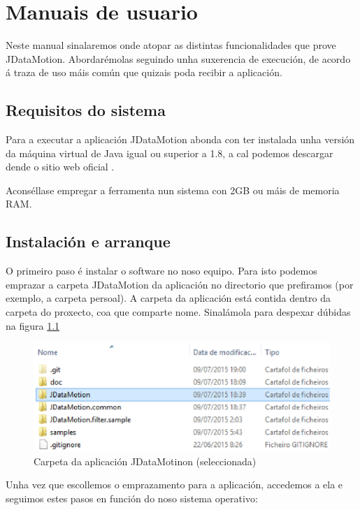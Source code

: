 \chapter{Manuais de usuario}

Neste manual sinalaremos onde atopar as distintas funcionalidades que prove JDataMotion. Abordarémolas seguindo unha suxerencia de execución, de acordo á traza de uso máis común que quizais poda recibir a aplicación.

\section{Requisitos do sistema}

Para a executar a aplicación JDataMotion abonda con ter instalada unha versión da máquina virtual de Java igual ou superior a 1.8, a cal podemos descargar dende o sitio web oficial \cite{java}.

Aconséllase empregar a ferramenta nun sistema con 2GB ou máis de memoria RAM.

\section{Instalación e arranque}

O primeiro paso é instalar o software no noso equipo. Para isto podemos emprazar a carpeta JDataMotion da aplicación no directorio que prefiramos (por exemplo, a carpeta persoal). A carpeta da aplicación está contida dentro da carpeta do proxecto, coa que comparte nome. Sinalámola para despexar dúbidas na figura \ref{carpetaAplicacion}

\begin{figure}
\centering
\includegraphics[width=\textwidth,height=\textheight,keepaspectratio]{figuras/carpetaAplicacion}
\caption{Carpeta da aplicación JDataMotinon (seleccionada)}
\label{carpetaAplicacion}
\end{figure}

Unha vez que escollemos o emprazamento para a aplicación, accedemos a ela e seguimos estes pasos en función do noso sistema operativo:

